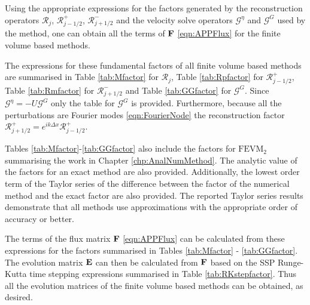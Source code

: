 Using the appropriate expressions for the factors generated by the reconstruction operators $\mathcal{R}_j$, $\mathcal{R}^+_{j-1/2}$, $\mathcal{R}^-_{j+1/2}$ and the velocity solve operators $\mathcal{G}^\eta$ and $\mathcal{G}^G$ used by the method, one can obtain all the terms of $\mathbf{F}$ \eqref{eqn:APPFlux} for the finite volume based methods.

The expressions for these fundamental factors of all finite volume based methods are summarised in Table \ref{tab:Mfactor} for $\mathcal{R}_j$, Table \ref{tab:Rpfactor} for $\mathcal{R}^+_{j-1/2}$, Table \ref{tab:Rmfactor} for $\mathcal{R}^-_{j+1/2}$ and Table \ref{tab:GGfactor} for $\mathcal{G}^G$. Since $\mathcal{G}^\eta = -U\mathcal{G}^G $ only the table for $\mathcal{G}^G$ is provided. Furthermore, because all the perturbations are Fourier modes \eqref{eqn:FourierNode} the reconstruction factor $\mathcal{R}^+_{j+1/2}= e^{ i k\Delta x}\mathcal{R}^+_{j-1/2}$. 

Tables \ref{tab:Mfactor}-\ref{tab:GGfactor} also include the factors for $\text{FEVM}_2$ summarising the work in Chapter \ref{chp:AnalNumMethod}. The analytic value of the factors for an exact method are also provided. Additionally, the lowest order term of the Taylor series of the difference between the factor of the numerical method and the exact factor are also provided. The reported Taylor series results demonstrate that all methods use approximations with the appropriate order of accuracy or better.

The terms of the flux matrix $\mathbf{F}$ \eqref{eqn:APPFlux} can be calculated from these expressions for the factors summarised in Tables \ref{tab:Mfactor} - \ref{tab:GGfactor}. The evolution matrix $\mathbf{E}$ can then be calculated from $\mathbf{F}$ based on the SSP Runge-Kutta time stepping expressions summarised in Table \ref{tab:RKstepfactor}. Thus all the evolution matrices of the finite volume based methods can be obtained, as desired.
 

